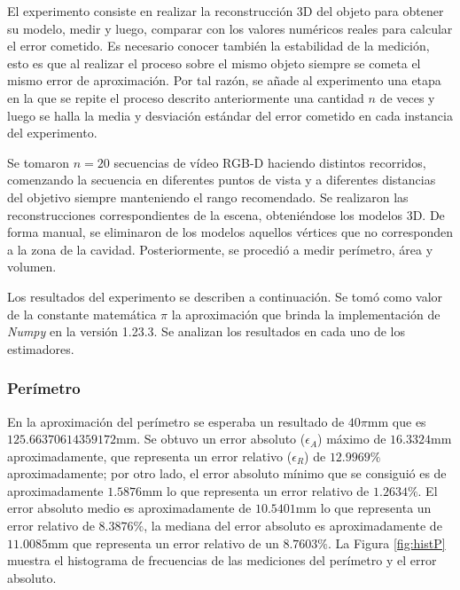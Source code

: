 El experimento consiste en realizar la reconstrucción 3D del objeto para obtener su modelo, medir y luego, comparar con los valores numéricos reales para calcular el error cometido. Es necesario conocer también la estabilidad de la medición, esto es que al realizar el proceso sobre el mismo objeto siempre se cometa el mismo error de aproximación. Por tal razón, se añade al experimento una etapa en la que se repite el proceso descrito anteriormente una cantidad $n$ de veces y luego se halla la media y desviación estándar del error cometido en cada instancia del experimento.

Se tomaron $n = 20$ secuencias de vídeo RGB-D haciendo distintos recorridos, comenzando la secuencia en diferentes puntos de vista y a diferentes distancias del objetivo siempre manteniendo el rango recomendado. Se realizaron las reconstrucciones correspondientes de la escena, obteniéndose los modelos 3D. De forma manual, se eliminaron de los modelos aquellos vértices que no corresponden a la zona de la cavidad. Posteriormente, se procedió a medir perímetro, área y volumen. 

Los resultados del experimento se describen a continuación. Se tomó como valor de la constante matemática $\pi$ la aproximación que brinda la implementación de \textit{Numpy} en la versión 1.23.3. Se analizan los resultados en cada uno de los estimadores.

\subsubsection{Perímetro}

En la aproximación del perímetro se esperaba un resultado de $40\pi\text{mm}$ que es $125.66370614359172\text{mm}$. Se obtuvo un error absoluto ($\epsilon_A$) máximo de $16.3324\text{mm}$ aproximadamente, que representa un error relativo ($\epsilon_R$) de $12.9969\%$ aproximadamente; por otro lado, el error absoluto mínimo que se consiguió es de aproximadamente $1.5876\text{mm}$ lo que representa un error relativo de $1.2634\%$. El error absoluto medio es aproximadamente de $10.5401\text{mm}$ lo que representa un error relativo de $8.3876\%$, la mediana del error absoluto es aproximadamente de $11.0085\text{mm}$ que representa un error relativo de un $8.7603\%$. La Figura \ref{fig:histP} muestra el histograma de frecuencias de las mediciones del perímetro y el error absoluto.

